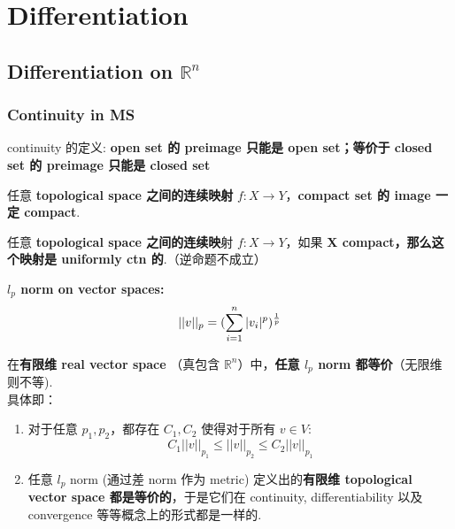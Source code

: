 \chapter{Differentiation}
\section{Differentiation on $\mathbb{R}^n$}
\subsection{Continuity in MS}
\begin{remark}
    continuity 的定义: \textbf{open set 的 preimage 只能是 open set；等价于 closed set 的 preimage 只能是 closed set}
\end{remark}


\begin{theorem}
任意\textbf{ topological space 之间的连续映射} $ f:X \rightarrow Y$，\textbf{compact set 的 image 一定 compact}.
\end{theorem}

\begin{theorem}
任意 \textbf{topological space 之间的连续映}射 $f:X \rightarrow Y$，如果 \textbf{X compact，那么这个映射是 uniformly ctn 的}.（逆命题不成立）
\end{theorem}

\begin{definition}
    \textbf{$l_p$ norm on vector spaces:}\\
$$||v||_p = (\sum_{i = 1}^n |v_i|^p)^{1\over p}$$
\end{definition}

\begin{theorem}
    在\textbf{有限维 real vector space} （真包含 $\mathbb{R}^n$）中，\textbf{任意 $l_p$ norm 都等价}（无限维则不等).\\
    具体即：
    \begin{enumerate}
        \item 对于任意 $p_1, p_2$，都存在 $C_1, C_2$ 使得对于所有 $v\in V$:
        $$
        C_1||v||_{p_1} \leq ||v||_{p_2} \leq C_2||v||_{p_1}
        $$
        \item 任意 $l_p$ norm (通过差 norm 作为 metric) 定义出的\textbf{有限维 topological vector space 都是等价的}，于是它们在 continuity, differentiability 以及 convergence 等等概念上的形式都是一样的.
    \end{enumerate}
\end{theorem}

